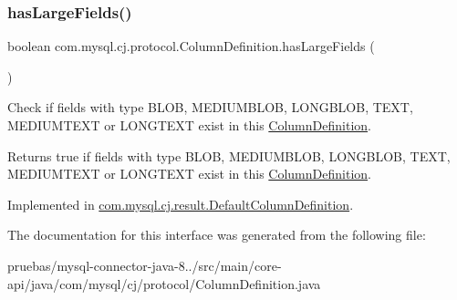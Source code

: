 \subsubsection{\texorpdfstring{has\+Large\+Fields()}{hasLargeFields()}}
{\footnotesize\ttfamily boolean com.\+mysql.\+cj.\+protocol.\+Column\+Definition.\+has\+Large\+Fields (\begin{DoxyParamCaption}{ }\end{DoxyParamCaption})}

Check if fields with type B\+L\+OB, M\+E\+D\+I\+U\+M\+B\+L\+OB, L\+O\+N\+G\+B\+L\+OB, T\+E\+XT, M\+E\+D\+I\+U\+M\+T\+E\+XT or L\+O\+N\+G\+T\+E\+XT exist in this \mbox{\hyperlink{interfacecom_1_1mysql_1_1cj_1_1protocol_1_1_column_definition}{Column\+Definition}}.

\begin{DoxyReturn}{Returns}
true if fields with type B\+L\+OB, M\+E\+D\+I\+U\+M\+B\+L\+OB, L\+O\+N\+G\+B\+L\+OB, T\+E\+XT, M\+E\+D\+I\+U\+M\+T\+E\+XT or L\+O\+N\+G\+T\+E\+XT exist in this \mbox{\hyperlink{interfacecom_1_1mysql_1_1cj_1_1protocol_1_1_column_definition}{Column\+Definition}}. 
\end{DoxyReturn}


Implemented in \mbox{\hyperlink{classcom_1_1mysql_1_1cj_1_1result_1_1_default_column_definition_a221996852cd52bf81bd9e3ecb8ab6ff5}{com.\+mysql.\+cj.\+result.\+Default\+Column\+Definition}}.



The documentation for this interface was generated from the following file\+:\begin{DoxyCompactItemize}
\item 
pruebas/mysql-\/connector-\/java-\/8../src/main/core-\/api/java/com/mysql/cj/protocol/Column\+Definition.\+java\end{DoxyCompactItemize}

